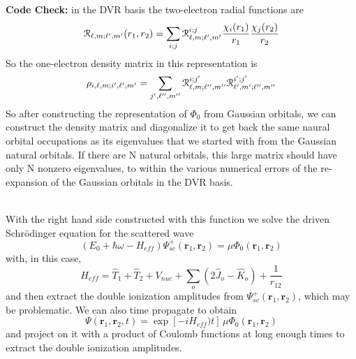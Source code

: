 \documentclass[%
pra%
,twocolumn%
,amssymb, nobibnotes, aps,
longbibliography
]{revtex4-1}
\begin{document}
\noindent \textbf{Code Check:}  in the DVR basis the two-electron radial functions are
\begin{equation}
\begin{split}
 \EuScript{R}_{\ell,m;\ell',m'} (r_1,r_2) = \sum_{i;j}  \EuScript{R}_{\ell,m;\ell',m'}^{i;j} \frac{\chi_i(r_1)}{r_1} \frac{ \chi_j(r_2) }{r_2}
\end{split}
\end{equation}
So the one-electron density matrix in this representation is
\begin{equation}
\begin{split}
\rho_{i,\ell,m;i',\ell',m'} = \sum_{j',\ell'',m''} \EuScript{R}_{\ell,m;\ell'',m''}^{i;j'}   \EuScript{R}_{\ell',m';\ell'',m''}^{i';j'} 
\end{split}
\end{equation}
So after constructing the representation of $\Phi_0$ from Gaussian orbitals, we can construct the density matrix and diagonalize it to get back the same naural orbital occupations as its eigenvalues that we started with from the Gaussian natural orbitals.  If there are N natural orbitals, this large matrix should have only N nonzero eigenvalues, to within the various numerical errors of the re-expansion of the Gaussian orbitals in the DVR basis.
\\
\


With the right hand side constructed with this function we solve the driven Schr\"odinger equation for the scattered wave
\begin{equation}
(E_0+\hbar \omega -H_{eff})\Psi_{sc}^+(\mathbf{r}_1,\mathbf{r}_2) = \mu \Phi_0(\mathbf{r}_1,\mathbf{r}_2)
\label{eq:drivenSE}
\end{equation}
with, in this case,
\begin{equation}
H_{eff} = \hat{T}_1 + \hat{T}_2 + V_{nuc} + \sum_o \left( 2 \hat{J}_o - \hat{K}_o \right) + \frac{1}{r_{12}} 
\end{equation}
and then extract the double ionization amplitudes from $\Psi_{sc}^+(\mathbf{r}_1,\mathbf{r}_2) $, which may be problematic. 
We can also time propagate to obtain 
\begin{equation}
\Psi(\mathbf{r}_1,\mathbf{r}_2,t) = \exp[-iH_{eff})t]\,\mu \Phi_0(\mathbf{r}_1,\mathbf{r}_2)
\end{equation}
 and project on it with a product of Coulomb functions at long enough times to extract the double ionization amplitudes.                                                                                                                  
\end{document}
